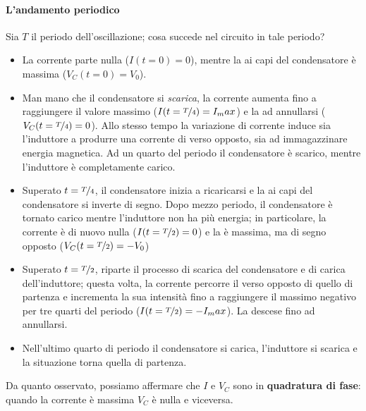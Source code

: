 \paragraph{L'andamento periodico}
Sia $T$ il periodo dell'oscillazione; cosa succede nel circuito in tale periodo?
\begin{itemize}
	\item La corrente parte nulla ($I(t=0)=0$), mentre la \ddp ai capi del condensatore è massima ($V_C(t=0)=V_0$).
	\item Man mano che il condensatore si \textit{scarica}, la corrente aumenta fino a raggiungere il valore massimo ($I(t=\nicefrac{T}{4})=I_max$) e la \ddp ad annullarsi ($V_C(t=\nicefrac{T}{4})=0$). Allo stesso tempo la variazione di corrente induce sia l'induttore a produrre una corrente di verso opposto, sia ad immagazzinare energia magnetica. Ad un quarto del periodo il condensatore è scarico, mentre l'induttore è completamente carico. 
	\item Superato $t=\nicefrac{T}{4}$, il condensatore inizia a ricaricarsi e la \ddp ai capi del condensatore si inverte di segno. Dopo mezzo periodo, il condensatore è tornato carico mentre l'induttore non ha più energia; in particolare, la corrente è di nuovo nulla ($I(t=\nicefrac{T}{2})=0$) e la \ddp è massima, ma di segno opposto ($V_C(t=\nicefrac{T}{2})=-V_0$)
	\item Superato $t=\nicefrac{T}{2}$, riparte il processo di scarica del condensatore e di carica dell'induttore; questa volta, la corrente percorre il verso opposto di quello di partenza e incrementa la sua intensità fino a raggiungere il massimo negativo per tre quarti del periodo ($I(t=\nicefrac{T}{2})=-I_max$). La \ddp descese fino ad annullarsi.
	\item Nell'ultimo quarto di periodo il condensatore si carica, l'induttore si scarica e la situazione torna quella di partenza.
\end{itemize}
Da quanto osservato, possiamo affermare che $I$ e $V_C$ sono in \textbf{quadratura di fase}: quando la corrente è massima $V_C$ è nulla e viceversa.
